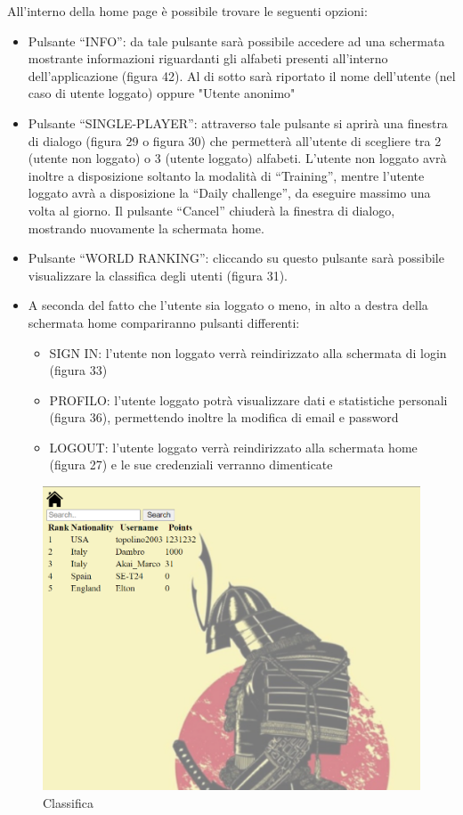 All’interno della home page è possibile trovare le seguenti opzioni:
\begin{itemize}
    \item Pulsante “INFO”: da tale pulsante sarà possibile accedere ad una schermata mostrante informazioni riguardanti gli alfabeti presenti all’interno dell’applicazione (figura 42). Al di sotto sarà riportato il nome dell'utente (nel caso di utente loggato) oppure "Utente anonimo"
    \item Pulsante “SINGLE-PLAYER”: attraverso tale pulsante si aprirà una finestra di dialogo (figura 29 o figura 30) che permetterà all’utente di scegliere tra 2 (utente non loggato) o 3 (utente loggato) alfabeti. L’utente non loggato avrà inoltre a disposizione soltanto la modalità di “Training”, mentre l’utente loggato avrà a disposizione la “Daily challenge”, da eseguire massimo una volta al giorno.
    Il pulsante “Cancel” chiuderà la finestra di dialogo, mostrando nuovamente la schermata home.
    \item Pulsante “WORLD RANKING”: cliccando su questo pulsante sarà possibile visualizzare la classifica degli utenti (figura 31).
    \item A seconda del fatto che l’utente sia loggato o meno, in alto a destra della schermata home compariranno pulsanti differenti:
    \begin{itemize}
        \item SIGN IN: l’utente non loggato verrà reindirizzato alla schermata di login (figura 33)
        \item PROFILO: l’utente loggato potrà visualizzare dati e statistiche personali (figura 36), permettendo inoltre la modifica di email e password
        \item LOGOUT: l’utente loggato verrà reindirizzato alla schermata home (figura 27) e le sue credenziali verranno dimenticate
    \end{itemize}
\end{itemize}


\begin{figure}[!h]
\centering
\includegraphics[scale=0.70]{images/classifica.png}
\caption{Classifica}
\label{fig:user_flow_guest}
\end{figure}
\noindent


